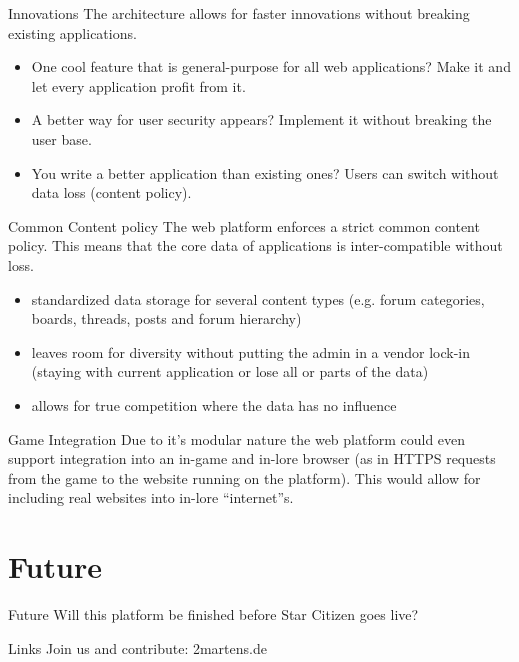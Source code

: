 \documentclass{beamer}
\begin{document}
	\begin{frame}{Innovations}
		The architecture allows for faster innovations without breaking existing applications.
		\begin{itemize}
			\item One cool feature that is general-purpose for all web applications? Make it and let every application profit from it.
			\item A better way for user security appears? Implement it without breaking the user base.
			\item You write a better application than existing ones? Users can switch without data loss (content policy).
		\end{itemize}
	\end{frame}
	\begin{frame}{Common Content policy}
		The web platform enforces a strict common content policy. This means that the core data of applications is inter-compatible without loss.
		
		\begin{itemize}
			\item standardized data storage for several content types (e.g. forum categories, boards, threads, posts and forum hierarchy)
			\item leaves room for diversity without putting the admin in a vendor lock-in (staying with current application or lose all or parts of the data)
			\item allows for true competition where the data has no influence
		\end{itemize}
	\end{frame}
	\begin{frame}{Game Integration}
		Due to it's modular nature the web platform could even support integration into an in-game and in-lore browser
		(as in HTTPS requests from the game to the website running on the platform). This would allow for including real
		websites into in-lore ``internet''s.
	\end{frame}
	
	\section{Future}
	\begin{frame}{Future}
		\centering Will this platform be finished before Star Citizen goes live?
	\end{frame}
	
	\begin{frame}{Links}
		\centering Join us and contribute: 2martens.de
	\end{frame}
\end{document}
